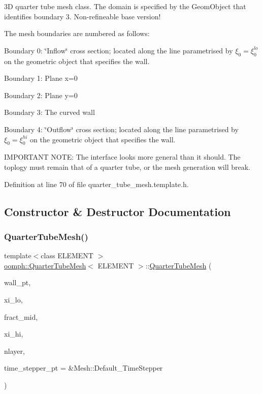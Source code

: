 3D quarter tube mesh class. The domain is specified by the Geom\+Object that identifies boundary 3. Non-\/refineable base version! 

The mesh boundaries are numbered as follows\+:
\begin{DoxyItemize}
\item Boundary 0\+: \char`\"{}\+Inflow\char`\"{} cross section; located along the line parametrised by $ \xi_0 = \xi_0^{lo} $ on the geometric object that specifies the wall.
\item Boundary 1\+: Plane x=0
\item Boundary 2\+: Plane y=0
\item Boundary 3\+: The curved wall
\item Boundary 4\+: \char`\"{}\+Outflow\char`\"{} cross section; located along the line parametrised by $ \xi_0 = \xi_0^{hi} $ on the geometric object that specifies the wall.
\end{DoxyItemize}

I\+M\+P\+O\+R\+T\+A\+NT N\+O\+TE\+: The interface looks more general than it should. The toplogy must remain that of a quarter tube, or the mesh generation will break. 

Definition at line 70 of file quarter\+\_\+tube\+\_\+mesh.\+template.\+h.



\subsection{Constructor \& Destructor Documentation}
\mbox{\label{classoomph_1_1QuarterTubeMesh_a4dfb9a85b3c07d8bafa0f916c445c18a}} 
\subsubsection{\texorpdfstring{Quarter\+Tube\+Mesh()}{QuarterTubeMesh()}}
{\footnotesize\ttfamily template$<$class E\+L\+E\+M\+E\+NT $>$ \\
\hyperlink{classoomph_1_1QuarterTubeMesh}{oomph\+::\+Quarter\+Tube\+Mesh}$<$ E\+L\+E\+M\+E\+NT $>$\+::\hyperlink{classoomph_1_1QuarterTubeMesh}{Quarter\+Tube\+Mesh} (\begin{DoxyParamCaption}\item[{Geom\+Object $\ast$}]{wall\+\_\+pt,  }\item[{const Vector$<$ double $>$ \&}]{xi\+\_\+lo,  }\item[{const double \&}]{fract\+\_\+mid,  }\item[{const Vector$<$ double $>$ \&}]{xi\+\_\+hi,  }\item[{const unsigned \&}]{nlayer,  }\item[{Time\+Stepper $\ast$}]{time\+\_\+stepper\+\_\+pt = {\ttfamily \&Mesh\+:\+:Default\+\_\+TimeStepper} }\end{DoxyParamCaption})}



